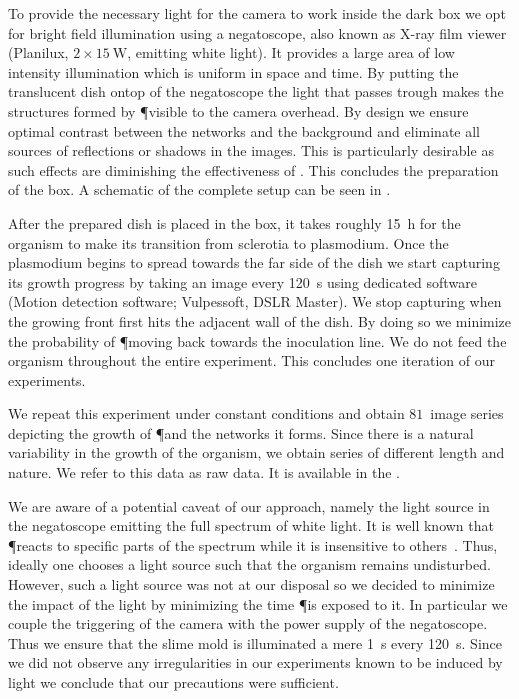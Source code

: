 		To provide the necessary light for the camera to work inside the dark box we opt for bright field illumination using a negatoscope, also known as X-ray film viewer (Planilux, $2 \times \SI{15}{\W}$, emitting white light). It provides a large area of low intensity illumination which is uniform in space and time. By putting the translucent dish ontop of the negatoscope the light that passes trough makes the structures formed by \P visible to the camera overhead. By design we ensure optimal contrast between the networks and the background and eliminate all sources of reflections or shadows in the images. This is particularly desirable as such effects are diminishing the effectiveness of \NEFI. This concludes the preparation of the box. A schematic of the complete setup can be seen in .

		After the prepared dish is placed in the box, it takes roughly \SI{15}{\hour} for the organism to make its transition from sclerotia to plasmodium. Once the plasmodium begins to spread towards the far side of the dish we start capturing its growth progress by taking an image every \SI{120}{\second} using dedicated software (Motion detection software; Vulpessoft, DSLR Master). We stop capturing when the growing front first hits the adjacent wall of the dish. By doing so we minimize the probability of \P moving back towards the inoculation line. We do not feed the organism throughout the entire experiment. This concludes one iteration of our experiments.

		We repeat this experiment under constant conditions and obtain $81$~image series depicting the growth of \P and the networks it forms. Since there is a natural variability in the growth of the organism, we obtain series of different length and nature. We refer to this data as raw data. It is available in the \SMGR.

		We are aware of a potential caveat of our approach, namely the light source in the negatoscope emitting the full spectrum of white light. It is well known that \P reacts to specific parts of the spectrum while it is insensitive to others~\cite{nakagaki1996action}. Thus, ideally one chooses a light source such that the organism remains undisturbed. However, such a light source was not at our disposal so we decided to minimize the impact of the light by minimizing the time \P is exposed to it. In particular we couple the triggering of the camera with the power supply of the negatoscope. Thus we ensure that the slime mold is illuminated a mere \SI{1}{\second} every \SI{120}{\second}. Since we did not observe any irregularities in our experiments known to be induced by light we conclude that our precautions were sufficient.

